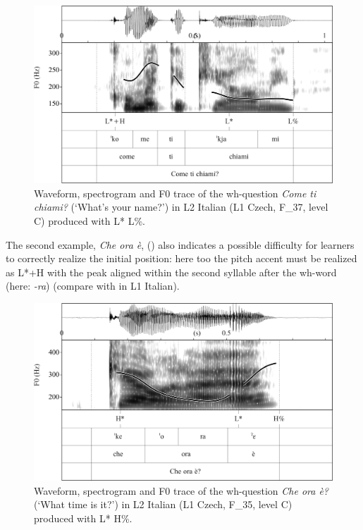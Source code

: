 \begin{figure}
\includegraphics[width=\textwidth]{figures/Figure_4.125.png}
\caption{Waveform, spectrogram and F0 trace of the wh-question \textit{Come ti chiami?} (‘What’s your name?’) in L2 Italian (L1 Czech, F\_37, level C) produced with L* L\%.}
\label{fig:4.125}
\end{figure}

The second example, \textit{Che ora è}, () also indicates a possible difficulty for learners to correctly realize the initial position: here too the pitch accent must be realized as L*+H with the peak aligned within the second syllable after the wh-word (here: \textit{{}-ra}) (compare with  in L1 Italian).

\begin{figure}
\includegraphics[width=\textwidth]{figures/Figure_4.126.png}
\caption{Waveform, spectrogram and F0 trace of the wh-question \textit{Che ora è?} (‘What time is it?’) in L2 Italian (L1 Czech, F\_35, level C) produced with L* H\%.}
\label{fig:4.126}
\end{figure}

